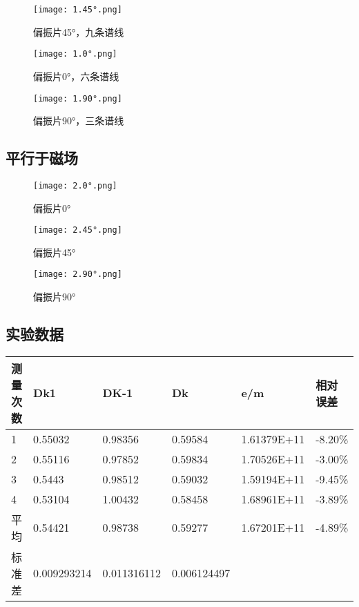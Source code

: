 \documentclass[dvipsnames, svgnames,a4paper,11pt]{article}
\begin{document}
	\begin{figure}[H]
		\begin{minipage}[b]{0.3\linewidth}
		  \centering
		  \texttt{[image: 1.45°.png]}
		  \caption{偏振片45°，九条谱线}
		\end{minipage}
		\hfill
		\begin{minipage}[b]{0.3\linewidth}
		  \centering
		  \texttt{[image: 1.0°.png]}
		  \caption{偏振片0°，六条谱线}
		\end{minipage}
		\hfill
		\begin{minipage}[b]{0.3\linewidth}
		  \centering
		  \texttt{[image: 1.90°.png]}
		  \caption{偏振片90°，三条谱线}
		\end{minipage}
	\end{figure}
	\subsection{平行于磁场}
\begin{figure}[H]
	\begin{minipage}[b]{0.3\linewidth}
	  \centering
	  \texttt{[image: 2.0°.png]}
	  \caption{偏振片0°}
	\end{minipage}
	\hfill
	\begin{minipage}[b]{0.3\linewidth}
	  \centering
	  \texttt{[image: 2.45°.png]}
	  \caption{偏振片45°}
	\end{minipage}
	\hfill
	\begin{minipage}[b]{0.3\linewidth}
	  \centering
	  \texttt{[image: 2.90°.png]}
	  \caption{偏振片90°}
	\end{minipage}
\end{figure}	
\subsection{实验数据}

\begin{table}[!ht]
    \centering
    \begin{tabular}{|l|l|l|l|l|l|}
    \hline
        测量次数 & Dk1 & DK-1 & Dk & e/m & 相对误差  \\ \hline
        1 & 0.55032 & 0.98356 & 0.59584 & 1.61379E+11 & -8.20\%  \\ \hline
        2 & 0.55116 & 0.97852 & 0.59834 & 1.70526E+11 & -3.00\%  \\ \hline
        3 & 0.5443 & 0.98512 & 0.59032 & 1.59194E+11 & -9.45\%  \\ \hline
        4 & 0.53104 & 1.00432 & 0.58458 & 1.68961E+11 & -3.89\%  \\ \hline
        平均 & 0.54421 & 0.98738 & 0.59277 & 1.67201E+11 & -4.89\%  \\ \hline
        标准差 & 0.009293214 & 0.011316112 & 0.006124497 & ~ &   \\ \hline
    \end{tabular}
\end{table}
\end{document}
